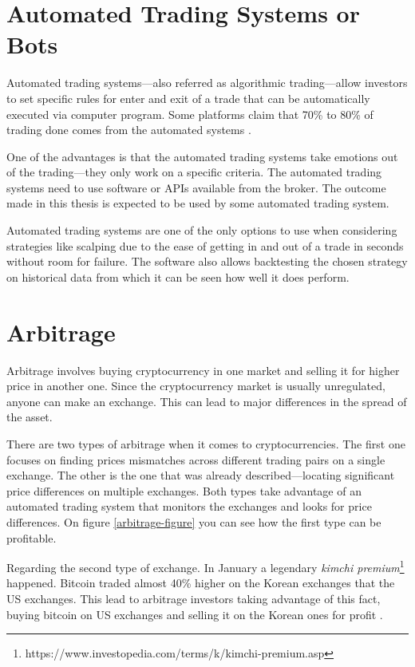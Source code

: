 \section{Automated Trading Systems or Bots}
\label{bots}
Automated trading systems---also referred as algorithmic trading---allow investors to set specific rules for enter and exit of a trade that can be automatically executed via computer program. Some platforms claim that 70\% to 80\% of trading done comes from the automated systems \cite{investopedia-bot-trading}.

One of the advantages is that the automated trading systems take emotions out of the trading---they only work on a specific criteria. The automated trading systems need to use software or APIs available from the broker. The outcome made in this thesis is expected to be used by some automated trading system.

Automated trading systems are one of the only options to use when considering strategies like scalping due to the ease of getting in and out of a trade in seconds without room for failure. The software also allows backtesting the chosen strategy on historical data from which it can be seen how well it does perform.

\section{Arbitrage}
Arbitrage involves buying cryptocurrency in one market and selling it for higher price in another one. Since the cryptocurrency market is usually unregulated, anyone can make an exchange. This can lead to major differences in the spread of the asset. 

There are two types of arbitrage when it comes to cryptocurrencies. The first one focuses on finding prices mismatches across different trading pairs on a single exchange. The other is the one that was already described---locating significant price differences on multiple exchanges. Both types take advantage of an automated trading system that monitors the exchanges and looks for price differences. On figure \ref{arbitrage-figure} you can see how the first type can be profitable.

Regarding the second type of exchange. In January a legendary \emph{kimchi premium}\footnote{https://www.investopedia.com/terms/k/kimchi-premium.asp} happened. Bitcoin traded almost 40\% higher on the Korean exchanges that the US exchanges. This lead to arbitrage investors taking advantage of this fact, buying bitcoin on US exchanges and selling it on the Korean ones for profit \cite{hodlbot:day-trading-cryptocurrency}.

